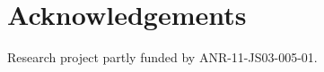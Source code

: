 \documentclass{aes2e}
\begin{document}
%


\section{Acknowledgements}

Research project partly funded by ANR-11-JS03-005-01.



%
%
\end{document}
